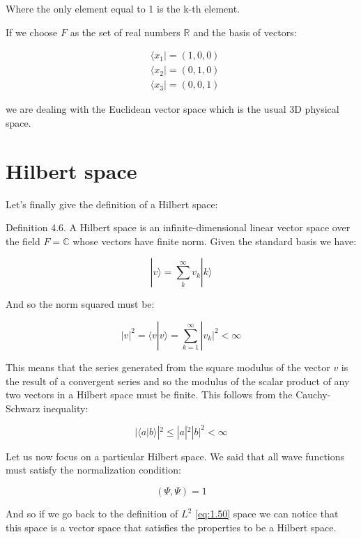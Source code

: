 Where the only element equal to 1 is the k-th element.

If we choose $F$ as the set of real numbers $\mathbb{R}$ and the basis of vectors:

\begin{align}
&\langle x_1| = (1,0,0) \\
&\langle x_2| = (0,1,0)  \\
&\langle x_3| = (0,0,1)
\end{align}

we are dealing with the Euclidean vector space which is the usual 3D physical space.


\section{Hilbert space}

Let's finally give the definition of a Hilbert space:

Definition 4.6. A Hilbert space is an infinite-dimensional linear vector space over the field $F = \mathbb{C}$ whose vectors have finite norm. Given the standard basis we have:

\begin{equation}
|v\rangle = \sum_{k}^{\infty} v_k|k\rangle
\end{equation}

And so the norm squared must be:

\begin{equation}
|v|^2 = \langle v|v\rangle = \sum_{k=1}^{\infty}|v_k|^2 < \infty
\end{equation}

This means that the series generated from the square modulus of the vector $v$ is the result of a convergent series and so the modulus of the scalar product of any two vectors in a Hilbert space must be finite. This follows from the Cauchy-Schwarz inequality:

\begin{equation}
|\langle a|b\rangle|^2 \leq |a|^2|b|^2 < \infty
\end{equation}

Let us now focus on a particular Hilbert space. We said that all wave functions must satisfy the normalization condition:

\begin{equation}
(\Psi, \Psi) = 1
\end{equation}

And so if we go back to the definition of $L^2$ \eqref{eq:1.50} space we can notice that this space is a vector space that satisfies the properties to be a Hilbert space.

